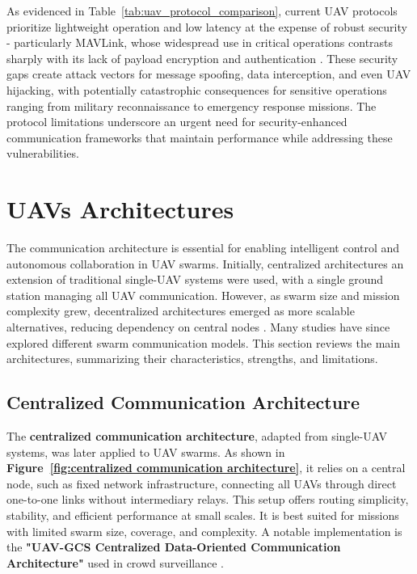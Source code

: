 As evidenced in Table~\ref{tab:uav_protocol_comparison}, current UAV protocols prioritize lightweight operation and low latency at the expense of robust security - particularly MAVLink, whose widespread use in critical operations contrasts sharply with its lack of payload encryption and authentication \cite{khan2020emerging}. These security gaps create attack vectors for message spoofing, data interception, and even UAV hijacking, with potentially catastrophic consequences for sensitive operations ranging from military reconnaissance to emergency response missions. The protocol limitations underscore an urgent need for security-enhanced communication frameworks that maintain performance while addressing these vulnerabilities.








\section{UAVs Architectures}



The communication architecture is essential for enabling intelligent control and autonomous collaboration in UAV swarms. Initially, centralized architectures an extension of traditional single-UAV systems were used, with a single ground station managing all UAV communication. However, as swarm size and mission complexity grew, decentralized architectures emerged as more scalable alternatives, reducing dependency on central nodes \cite{Cao2012}. Many studies have since explored different swarm communication models. This section reviews the main architectures, summarizing their characteristics, strengths, and limitations.






\subsection{Centralized Communication Architecture}
\label{sec:centralized}

The \textbf{centralized communication architecture}, adapted from single-UAV systems, was later applied to UAV swarms. As shown in \textbf{Figure~\ref{fig:centralized communication architecture}}, it relies on a central node, such as fixed network infrastructure, connecting all UAVs through direct one-to-one links without intermediary relays. This setup offers routing simplicity, stability, and efficient performance at small scales. It is best suited for missions with limited swarm size, coverage, and complexity. A notable implementation is the \textbf{"UAV-GCS Centralized Data-Oriented Communication Architecture"} used in crowd surveillance \cite{Chen2020}.


